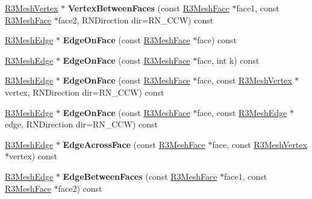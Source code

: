 \begin{DoxyCompactItemize}
\item 
\hyperlink{class_r3_mesh_vertex}{R3\+Mesh\+Vertex} $\ast$ {\bfseries Vertex\+Between\+Faces} (const \hyperlink{class_r3_mesh_face}{R3\+Mesh\+Face} $\ast$face1, const \hyperlink{class_r3_mesh_face}{R3\+Mesh\+Face} $\ast$face2, R\+N\+Direction dir=R\+N\+\_\+\+C\+CW) const \hypertarget{class_r3_mesh_a5dd97380df95adfd1c9941320684929a}{}\label{class_r3_mesh_a5dd97380df95adfd1c9941320684929a}

\item 
\hyperlink{class_r3_mesh_edge}{R3\+Mesh\+Edge} $\ast$ {\bfseries Edge\+On\+Face} (const \hyperlink{class_r3_mesh_face}{R3\+Mesh\+Face} $\ast$face) const \hypertarget{class_r3_mesh_adacbfcce088ec8b7d85a992cb2bfbb5f}{}\label{class_r3_mesh_adacbfcce088ec8b7d85a992cb2bfbb5f}

\item 
\hyperlink{class_r3_mesh_edge}{R3\+Mesh\+Edge} $\ast$ {\bfseries Edge\+On\+Face} (const \hyperlink{class_r3_mesh_face}{R3\+Mesh\+Face} $\ast$face, int k) const \hypertarget{class_r3_mesh_aedf760f6a697aa1d216ded7ed64a09a8}{}\label{class_r3_mesh_aedf760f6a697aa1d216ded7ed64a09a8}

\item 
\hyperlink{class_r3_mesh_edge}{R3\+Mesh\+Edge} $\ast$ {\bfseries Edge\+On\+Face} (const \hyperlink{class_r3_mesh_face}{R3\+Mesh\+Face} $\ast$face, const \hyperlink{class_r3_mesh_vertex}{R3\+Mesh\+Vertex} $\ast$vertex, R\+N\+Direction dir=R\+N\+\_\+\+C\+CW) const \hypertarget{class_r3_mesh_acb7549b138275ddf6b4c9ea6e78d9571}{}\label{class_r3_mesh_acb7549b138275ddf6b4c9ea6e78d9571}

\item 
\hyperlink{class_r3_mesh_edge}{R3\+Mesh\+Edge} $\ast$ {\bfseries Edge\+On\+Face} (const \hyperlink{class_r3_mesh_face}{R3\+Mesh\+Face} $\ast$face, const \hyperlink{class_r3_mesh_edge}{R3\+Mesh\+Edge} $\ast$edge, R\+N\+Direction dir=R\+N\+\_\+\+C\+CW) const \hypertarget{class_r3_mesh_a629ee4613b65d6e6684a489d137a8f95}{}\label{class_r3_mesh_a629ee4613b65d6e6684a489d137a8f95}

\item 
\hyperlink{class_r3_mesh_edge}{R3\+Mesh\+Edge} $\ast$ {\bfseries Edge\+Across\+Face} (const \hyperlink{class_r3_mesh_face}{R3\+Mesh\+Face} $\ast$face, const \hyperlink{class_r3_mesh_vertex}{R3\+Mesh\+Vertex} $\ast$vertex) const \hypertarget{class_r3_mesh_a3deeaf98e9152c7b310710f4da7d316b}{}\label{class_r3_mesh_a3deeaf98e9152c7b310710f4da7d316b}

\item 
\hyperlink{class_r3_mesh_edge}{R3\+Mesh\+Edge} $\ast$ {\bfseries Edge\+Between\+Faces} (const \hyperlink{class_r3_mesh_face}{R3\+Mesh\+Face} $\ast$face1, const \hyperlink{class_r3_mesh_face}{R3\+Mesh\+Face} $\ast$face2) const \hypertarget{class_r3_mesh_a469cd41b022214a209d956f3ba8d12e2}{}\label{class_r3_mesh_a469cd41b022214a209d956f3ba8d12e2}


\end{DoxyCompactItemize}

